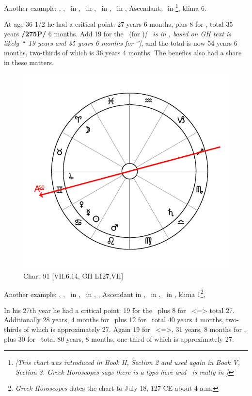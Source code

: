 Another example: \Sun, \Mars, \Venus\, in \Sagittarius, \Moon\, in \Libra, \Saturn\, in \Gemini, \Jupiter\, in \Virgo, Ascendant, \Mercury\, in \Capricorn \footnote{\textit{[This chart was introduced in Book II, Section 2 and used again in Book V, Section 3.  Greek Horoscopes says there is a typo here and \Mercury\, is really in \Scorpio]}}, klima 6. 

At age 36 1/2 he had a critical point: 27 years 6 months, plus 8 for \Venus, total 35 years \textbf{/275P/} 6 months. Add 19 for the \Sun\, (for \Gemini)\textit{[ \Sun\, is in \Sagittarius, based on GH text is likely ``\Sun\, 19 years and 35 years 6 months for \Sagittarius'']}, and the total is now 54 years 6 months, two-thirds of which is 36 years 4 months. The benefics also had a share in these matters. 

\newpage
\begin{figure}
\centering
\vspace{0pt}
\includegraphics[width=.68\textwidth]{charts/7_6_14}
\caption{Chart 91 [VII.6.14, GH L127,VII] }
\label{fig:chart91}
\end{figure} 

Another example: \Sun, \Mercury, \Venus\, in \Cancer, \Moon\, in \Aries, \Jupiter, Ascendant in \Gemini, \Saturn\, in \Libra, \Mars\, in \Leo, klima 1\footnote{\textit{Greek Horoscopes} dates the chart to July 18, 127 CE about 4 a.m.},

In his 27th year he had a critical point: 19 for the \Sun\, plus 8 for \Libra\, <=\Venus> total 27. Additionally 28 years, 4 months for \Gemini\, plus 12 for \Jupiter\, total 40 years 4
months, two-thirds of which is approximately 27. Again 19 for \Leo\, <=\Sun>, 31 years, 8 months for \Cancer, plus 30 for \Saturn\, total 80 years, 8 months, one-third of which is approximately 27.

